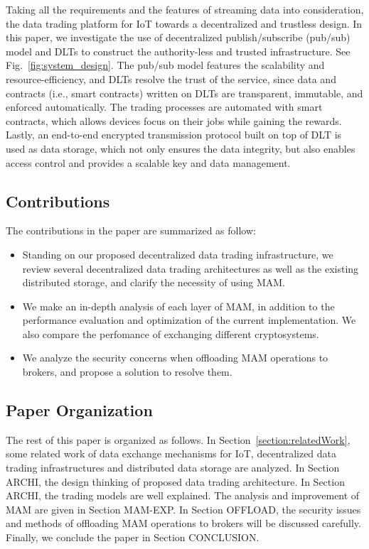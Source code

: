 \documentclass[conference]{IEEEtran}
\begin{document}
Taking all the requirements and the features of streaming data into consideration, the data trading platform for IoT towards a decentralized and trustless design. In this paper, we investigate the use of decentralized publish/subscribe (pub/sub) model and DLTs to construct the authority-less and trusted infrastructure. See Fig.~\ref{fig:system_design}. The pub/sub model features the scalability and resource-efficiency, and DLTs resolve the trust of the service, since data and contracts (i.e., smart contracts) written on DLTs are transparent, immutable, and enforced automatically. The trading processes are automated with smart contracts, which allows devices focus on their jobs while gaining the rewards. Lastly, an end-to-end encrypted transmission protocol built on top of DLT is used as data storage, which not only ensures the data integrity, but also enables access control and provides a scalable key and data management.

\subsection{Contributions}
The contributions in the paper are summarized as follow:
\begin{itemize}
	\item Standing on our proposed decentralized data trading infrastructure, we review several decentralized data trading architectures as well as the existing distributed storage, and clarify the necessity of using MAM.  
    \item We make an in-depth analysis of each layer of MAM, in addition to the performance evaluation and optimization of the current implementation. We also compare the perfomance of exchanging different cryptosystems.
	\item We analyze the security concerns when offloading MAM operations to brokers, and propose a solution to resolve them.
\end{itemize}


\subsection{Paper Organization}
The rest of this paper is organized as follows. In Section~\ref{section:relatedWork}, some related work of data exchange mechanisms for IoT, decentralized data trading infrastructures and distributed data storage are analyzed. In Section ARCHI, the design thinking of proposed data trading architecture. In Section ARCHI, the trading models are well explained. The analysis and improvement of MAM are given in Section MAM-EXP. In Section OFFLOAD, the security issues and methods of offloading MAM operations to brokers will be discussed carefully. Finally, we conclude the paper in Section CONCLUSION.
\end{document}
